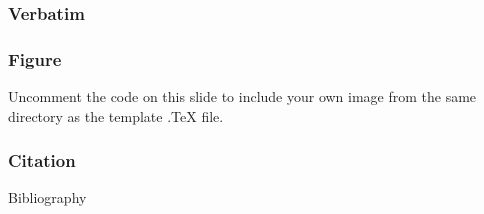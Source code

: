 \documentclass{beamer}
\begin{document}

\begin{frame}[fragile] %
\frametitle{Verbatim}
\begin{example}
\end{example}
\end{frame}


\begin{frame}
\frametitle{Figure}
Uncomment the code on this slide to include your own image from the same directory as the template .TeX file.
\end{frame}


\begin{frame}[fragile] %
\frametitle{Citation}
\cite{MaLARea}

\end{frame}



\begin{frame}{Bibliography}


\end{frame}

\end{document}
